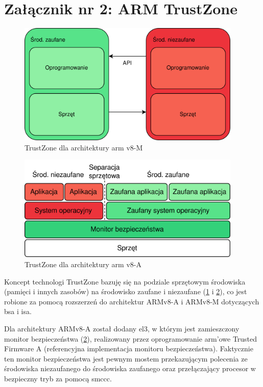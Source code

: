 \documentclass[../main]{subfiles}
\begin{document}
\section*{Załącznik nr 2: ARM TrustZone}\label{sec:zalacznik-2}
\begin{figure}
    \centering
    \includegraphics[width=0.95\textwidth]{Images/trustzone-m.png}
    \caption{TrustZone dla architektury \acrshort{arm} v8-M}
    \label{fig:trustzone-m}
\end{figure}
\begin{figure}
    \centering
    \includegraphics[width=0.95\textwidth]{Images/trustzone-a.png}
    \caption{TrustZone dla architektury \acrshort{arm} v8-A}
    \label{fig:trustzone-a}
\end{figure}

Koncept technologi TrustZone bazuję się na podziale sprzętowym środowiska (pamięci i innych zasobów) na
środowisko zaufane i niezaufane (\cref{fig:trustzone-m} i
\cref{fig:trustzone-a}), co jest robione za pomocą rozszerzeń do architektur ARMv8-A i
ARMv8-M dotyczących \acrshort{bsa} i \acrshort{isa}.

Dla architektury ARMv8-A został dodany \acrshort{el}3, w którym jest zamieszczony monitor bezpieczeństwa
(\cref{fig:trustzone-a}), realizowany przez oprogramowanie \acrshort{arm}'owe Trusted
Firmware A (referencyjna implementacja monitoru bezpieczeństwa). Faktycznie ten monitor bezpieczeństwa
jest pewnym mostem przekazującym polecenia ze środowiska niezaufanego do środowiska zaufanego oraz
przełączający procesor w bezpieczny tryb za pomocą \acrshort{smccc}.
\cite{smccc}\cite{trustzoneaarch64} %
\end{document}
